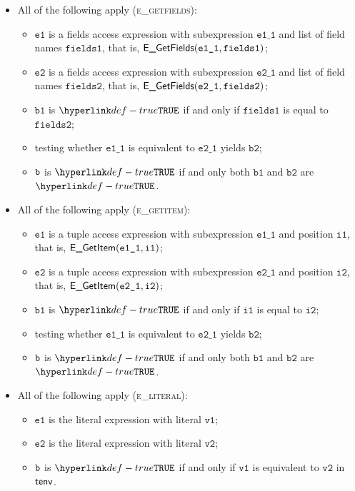 \documentclass{book}
\newcommand\ProseOrTypeError[0]{\ProseTerminateAs{\TypeErrorConfig}}
\newcommand\vione[0]{\texttt{i1}}
\newcommand\vitwo[0]{\texttt{i2}}
\newcommand\vvone[0]{\texttt{v1}}
\newcommand\vvtwo[0]{\texttt{v2}}
\newcommand\veone[0]{\texttt{e1}}
\newcommand\vetwo[0]{\texttt{e2}}
\newcommand\vfieldsone[0]{\texttt{fields1}}
\newcommand\vfieldstwo[0]{\texttt{fields2}}
\newcommand\veoneone[0]{\texttt{e1\_1}}
\newcommand\vetwoone[0]{\texttt{e2\_1}}
\newcommand\vbone[0]{\texttt{b1}}
\newcommand\vbtwo[0]{\texttt{b2}}
\begin{document}
\begin{itemize}
  \item All of the following apply (\textsc{e\_getfields}):
  \begin{itemize}
    \item $\veone$ is a fields access expression with subexpression $\veoneone$ and list of field names $\vfieldsone$,
          that is, $\EGetFields(\veoneone, \vfieldsone)$;
    \item $\vetwo$ is a fields access expression with subexpression $\vetwoone$ and list of field names $\vfieldstwo$,
          that is, $\EGetFields(\vetwoone, \vfieldstwo)$;
    \item $\vbone$ is $\True$ if and only if $\vfieldsone$ is equal to $\vfieldstwo$;
    \item testing whether $\veoneone$ is equivalent to $\vetwoone$ yields $\vbtwo$\ProseOrTypeError;
    \item $\texttt{b}$ is $\True$ if and only both $\vbone$ and $\vbtwo$ are $\True$.
  \end{itemize}

  \item All of the following apply (\textsc{e\_getitem}):
  \begin{itemize}
    \item $\veone$ is a tuple access expression with subexpression $\veoneone$ and position $\vione$,
          that is, $\EGetItem(\veoneone, \vione)$;
    \item $\vetwo$ is a tuple access expression with subexpression $\vetwoone$ and position $\vitwo$,
          that is, $\EGetItem(\vetwoone, \vitwo)$;
    \item $\vbone$ is $\True$ if and only if $\vione$ is equal to $\vitwo$;
    \item testing whether $\veoneone$ is equivalent to $\vetwoone$ yields $\vbtwo$\ProseOrTypeError;
    \item $\texttt{b}$ is $\True$ if and only both $\vbone$ and $\vbtwo$ are $\True$.
  \end{itemize}

  \item All of the following apply (\textsc{e\_literal}):
  \begin{itemize}
    \item $\veone$ is the literal expression with literal $\vvone$;
    \item $\vetwo$ is the literal expression with literal $\vvtwo$;
    \item $\texttt{b}$ is $\True$ if and only if $\vvone$ is equivalent to $\vvtwo$ in $\textsf{tenv}$.
  \end{itemize}


\end{itemize}
\end{document}
